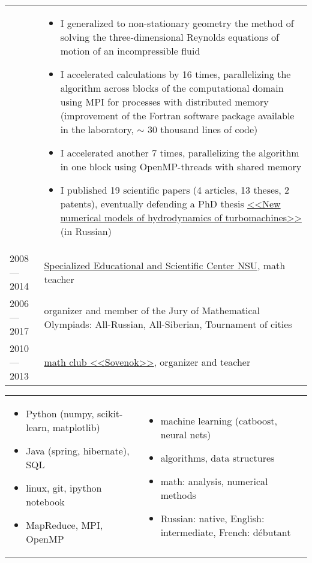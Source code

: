 \documentclass[11pt]{article}
\begin{document}
\begin{longtable} {l | p{}}
& \vspace{-1.5em} \begin{itemize}
	\item I generalized to non-stationary geometry the method of solving the three-dimensional Reynolds equations of motion of an incompressible fluid
	\item I accelerated calculations by 16 times, parallelizing the algorithm across blocks of the computational domain using MPI for processes with distributed memory (improvement of the Fortran software package available in the laboratory, $\sim$ 30 thousand lines of code)
	\item I accelerated another 7 times, parallelizing the algorithm in one block using OpenMP-threads with shared memory
	\item I published 19 scientific papers (4 articles, 13 theses, 2 patents), eventually defending a PhD thesis \href{https://github.com/avalur/dissertation/blob/master/to_print/autoref_Avdyushenko.pdf}{<<New numerical models of hydrodynamics of turbomachines>>} (in Russian)
\end{itemize}
\\

2008 — 2014 & {\href{http://sesc.nsu.ru}{Specialized Educational and Scientific Center NSU}, math teacher}\\
2006 — 2017 & {organizer and member of the Jury of Mathematical Olympiads: All-Russian, All-Siberian, Tournament of cities}\\
2010 — 2013 & {\href{https://www.sovenok.academy/}{math club <<Sovenok>>}, organizer and teacher}\\

\end{longtable}

\begin{longtable} {p{}p{}}
\vspace{-2em}
\begin{itemize}
	\item Python (numpy, scikit-learn, matplotlib)
	\item Java (spring, hibernate), SQL
	\item linux, git, ipython notebook
	\item MapReduce, MPI, OpenMP
\end{itemize}
&
\vspace{-2em}
\begin{itemize}
	\item machine learning (catboost, neural nets)
	\item algorithms, data structures
	\item math: analysis, numerical methods
	\item Russian: native, English: intermediate, French: débutant
\end{itemize}
\\
\end{longtable}
\end{document}

